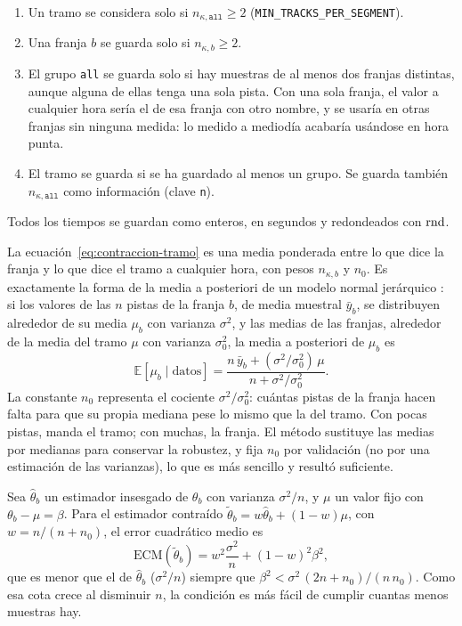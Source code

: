 \begin{enumerate}
  \item Un tramo se considera solo si $n_{\kappa,\texttt{all}}\ge2$ (\texttt{MIN\_TRACKS\_PER\_SEGMENT}).
  \item Una franja $b$ se guarda solo si $n_{\kappa,b}\ge2$.
  \item El grupo \texttt{all} se guarda solo si hay muestras de al menos dos franjas distintas, aunque alguna de ellas
        tenga una sola pista. Con una sola franja, el valor a cualquier hora sería el de esa franja con otro nombre, y
        se usaría en otras franjas sin ninguna medida: lo medido a mediodía acabaría usándose en hora punta.
  \item El tramo se guarda si se ha guardado al menos un grupo. Se guarda también $n_{\kappa,\texttt{all}}$ como
        información (clave \texttt{n}).
\end{enumerate}

Todos los tiempos se guardan como enteros, en segundos y redondeados con $\operatorname{rnd}$.

La ecuación~\eqref{eq:contraccion-tramo} es una media ponderada entre lo que dice la
franja y lo que dice el tramo a cualquier hora, con pesos $n_{\kappa,b}$ y $n_0$. Es exactamente la forma de la media
a posteriori de un modelo normal jerárquico \citep{gelman2013}: si los valores de las $n$ pistas de la franja $b$, de
media muestral $\bar y_b$, se distribuyen alrededor de su media $\mu_b$ con varianza $\sigma^2$, y las medias de las
franjas, alrededor de la media del tramo $\mu$ con varianza $\sigma_0^2$, la media a posteriori de $\mu_b$ es
\[
\mathbb{E}[\mu_b\mid\text{datos}]=\frac{n\,\bar y_b+(\sigma^2/\sigma_0^2)\,\mu}{n+\sigma^2/\sigma_0^2}.
\]
La constante $n_0$ representa el cociente $\sigma^2/\sigma_0^2$: cuántas pistas de la franja hacen falta para que su
propia mediana pese lo mismo que la del tramo. Con pocas pistas, manda el tramo; con muchas, la franja. El método
sustituye las medias por medianas para conservar la robustez, y fija $n_0$ por validación (no por una estimación de las
varianzas), lo que es más sencillo y resultó suficiente.

\begin{proposicion}
\label{prop:contraccion}
Sea $\hat\theta_b$ un estimador insesgado de $\theta_b$ con varianza $\sigma^2/n$, y $\mu$ un valor fijo con
$\theta_b-\mu=\beta$. Para el estimador contraído $\tilde\theta_b=w\hat\theta_b+(1-w)\mu$, con $w=n/(n+n_0)$, el error
cuadrático medio es
\[
\mathrm{ECM}(\tilde\theta_b)=w^2\frac{\sigma^2}{n}+(1-w)^2\beta^2 ,
\]
que es menor que el de $\hat\theta_b$ ($\sigma^2/n$) siempre que $\beta^2<\sigma^2\,(2n+n_0)/(n\,n_0)$. Como esa cota
crece al disminuir $n$, la condición es más fácil de cumplir cuantas menos muestras hay.
\end{proposicion}

